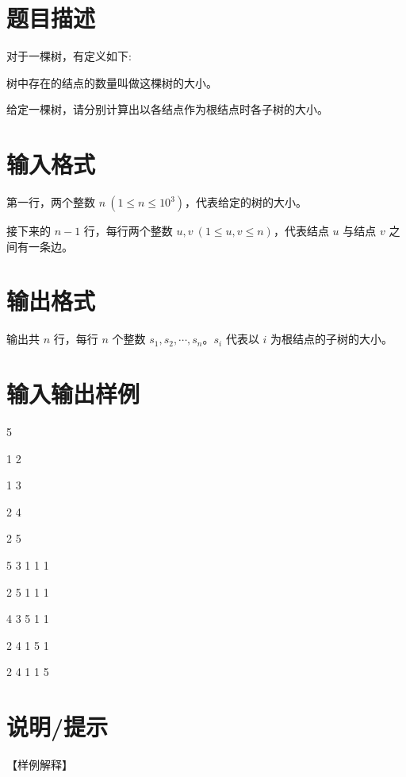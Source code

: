 \documentclass{ctpro}
\begin{document}
\makeproblem
\section*{题目描述}
对于一棵树，有定义如下:

\begin{definition}[树的大小]
	树中存在的结点的数量叫做这棵树的大小。
\end{definition}

给定一棵树，请分别计算出以各结点作为根结点时各子树的大小。

\section*{输入格式}
第一行，两个整数 $n~(1 \leq n \leq 10^3)$，代表给定的树的大小。

接下来的 $n-1$ 行，每行两个整数 $u,v~(1 \leq u,v \leq n)$，代表结点 $u$ 与结点 $v$ 之间有一条边。

\section*{输出格式}
输出共 $n$ 行，每行 $n$ 个整数 $s_1,s_2,\cdots,s_n$。$s_i$ 代表以 $i$ 为根结点的子树的大小。

\section*{输入输出样例}
\testcasetab
{
	5\par
	1 2\par
	1 3\par
	2 4\par
	2 5
}
{
	5 3 1 1 1\par
	2 5 1 1 1\par
	4 3 5 1 1\par
	2 4 1 5 1\par
	2 4 1 1 5
}

\section*{说明/提示}
【样例解释】
\end{document}
